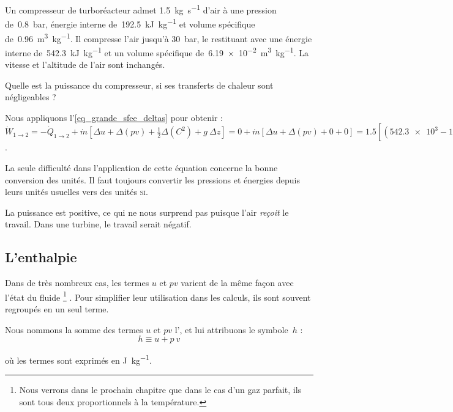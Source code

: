 		\begin{anexample}
			Un compresseur de turboréacteur admet \SI{1,5}{\kilogram\per\second} d’air à une pression de~\SI{0,8}{\bar}, énergie interne de~\SI{192,5}{\kilo\joule\per\kilogram} et volume spécifique de~\SI{0,96}{\metre\cubed\per\kilogram}. Il compresse l’air jusqu’à \SI{30}{\bar}, le restituant avec une énergie interne de~\SI{542,3}{\kilo\joule\per\kilogram} et un volume spécifique de~\SI{6,19e-2}{\metre\cubed\per\kilogram}. La vitesse et l’altitude de l’air sont inchangés.
			
			Quelle est la puissance du compresseur, si ses transferts de chaleur sont négligeables ?
				\begin{answer}
					Nous appliquons l’\cref{eq_grande_sfee_deltas} pour obtenir :  $\dot{W}_{1 \to 2}
					= -\dot{Q}_{1 \to 2} + \dot{m} \left[ \Delta u + \Delta (p v) + \frac{1}{2} \Delta \left(C^2\right) + g \ \Delta z \right]
					= 0 + \dot{m} \left[ \Delta u + \Delta (p v) + 0 + 0 \right]
					= \num{1,5} \left[ (\num{542,3e3} - \num{192,5e3}) + (\num{30e5}\times\num{6,19e-2} - \num{0,8e5}\times\num{0,96})\right]
					= \SI{+6,881e5}{\watt} = \SI{+688,1}{\kilo\watt}$.
					\begin{remark}La seule difficulté dans l’application de cette équation concerne la bonne conversion des unités. Il faut toujours convertir les pressions et énergies depuis leurs unités usuelles vers des unités \textsc{si}.\end{remark}
					\begin{remark}La puissance est positive, ce qui ne nous surprend pas puisque l’air \emph{reçoit} le travail. Dans une turbine, le travail serait négatif.\end{remark}
				\end{answer}
		\end{anexample}

	\subsection{L’enthalpie}

		Dans de très nombreux cas, les termes $u$ et $p v$ varient de la même façon avec l’état du fluide%
			\footnote{Nous verrons dans le prochain chapitre que dans le cas d’un gaz parfait, ils sont tous deux proportionnels à la température.}%
		. Pour simplifier leur utilisation dans les calculs, ils sont souvent regroupés en un seul terme.

		Nous nommons la somme des termes $u$ et $p v$ l’, et lui attribuons le symbole~$h$ :
		\begin{equation}
			h \equiv u + p \ v
			\label{def_enthalpie}
		\end{equation}
		\begin{equationterms}
			\item où les termes sont exprimés en \si{\joule\per\kilogram}.
		\end{equationterms}

